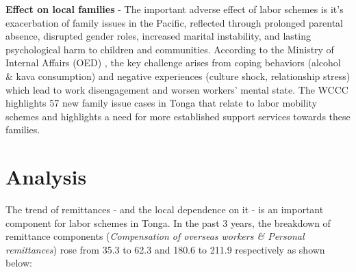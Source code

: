 \documentclass[9pt,a4paper,twocolumn,twoside]{tau-class/tau}
\begin{document}

   \textbf{Effect on local families} - The important adverse effect of labor schemes is it's exacerbation of family issues in the Pacific, reflected through prolonged parental absence, disrupted gender roles, increased marital instability, and lasting psychological harm to children and communities. According to the Ministry of Internal Affairs (OED) \cite{Social_report}, the key challenge arises from coping behaviors (alcohol \& kava consumption) and negative experiences (culture shock, relationship stress) which lead to work disengagement and worsen workers' mental state. The WCCC highlights 57 new family issue cases in Tonga that relate to labor mobility schemes and highlights a need for more established support services towards these families.


	
\section{Analysis}

    The trend of remittances - and the local dependence on it -  is an important component for labor schemes in Tonga. In the past 3 years, the breakdown of remittance components (\textit{Compensation of overseas workers \& Personal remittances}) rose from 35.3 to 62.3 and 180.6 to 211.9 respectively as shown below: 
\end{document}
